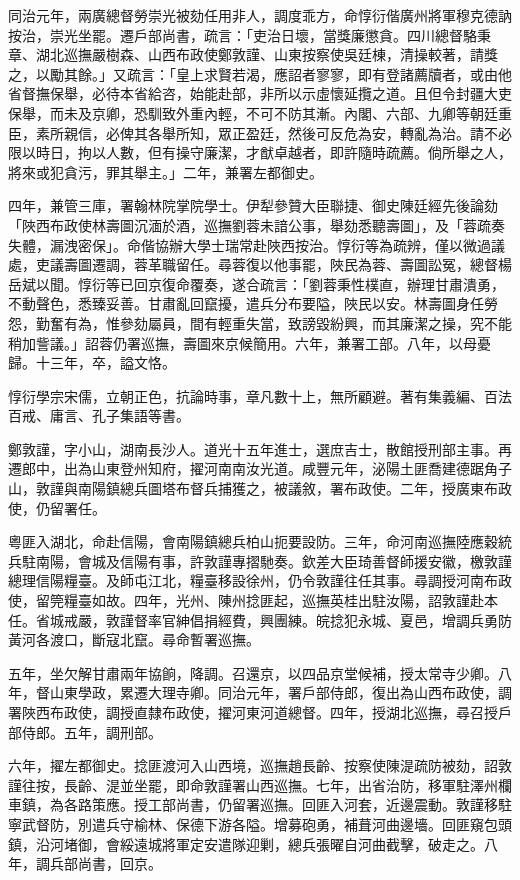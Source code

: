 \begin{pinyinscope}
同治元年，兩廣總督勞崇光被劾任用非人，調度乖方，命惇衍偕廣州將軍穆克德訥按治，崇光坐罷。遷戶部尚書，疏言：「吏治日壞，當獎廉懲貪。四川總督駱秉章、湖北巡撫嚴樹森、山西布政使鄭敦謹、山東按察使吳廷棟，清操較著，請獎之，以勵其餘。」又疏言：「皇上求賢若渴，應詔者寥寥，即有登諸薦牘者，或由他省督撫保舉，必待本省給咨，始能赴部，非所以示虛懷延攬之道。且但令封疆大吏保舉，而未及京卿，恐馴致外重內輕，不可不防其漸。內閣、六部、九卿等朝廷重臣，素所親信，必俾其各舉所知，眾正盈廷，然後可反危為安，轉亂為治。請不必限以時日，拘以人數，但有操守廉潔，才猷卓越者，即許隨時疏薦。倘所舉之人，將來或犯貪污，罪其舉主。」二年，兼署左都御史。

四年，兼管三庫，署翰林院掌院學士。伊犁參贊大臣聯捷、御史陳廷經先後論劾「陜西布政使林壽圖沉湎於酒，巡撫劉蓉未諳公事，舉劾悉聽壽圖」，及「蓉疏奏失體，漏洩密保」。命偕協辦大學士瑞常赴陜西按治。惇衍等為疏辨，僅以微過議處，吏議壽圖遷調，蓉革職留任。尋蓉復以他事罷，陜民為蓉、壽圖訟冤，總督楊岳斌以聞。惇衍等已回京復命覆奏，遂合疏言：「劉蓉秉性樸直，辦理甘肅潰勇，不動聲色，悉臻妥善。甘肅亂回竄擾，遣兵分布要隘，陜民以安。林壽圖身任勞怨，勤奮有為，惟參劾屬員，間有輕重失當，致謗毀紛興，而其廉潔之操，究不能稍加訾議。」詔蓉仍署巡撫，壽圖來京候簡用。六年，兼署工部。八年，以母憂歸。十三年，卒，謚文恪。

惇衍學宗宋儒，立朝正色，抗論時事，章凡數十上，無所顧避。著有集義編、百法百戒、庸言、孔子集語等書。

鄭敦謹，字小山，湖南長沙人。道光十五年進士，選庶吉士，散館授刑部主事。再遷郎中，出為山東登州知府，擢河南南汝光道。咸豐元年，泌陽土匪喬建德踞角子山，敦謹與南陽鎮總兵圖塔布督兵捕獲之，被議敘，署布政使。二年，授廣東布政使，仍留署任。

粵匪入湖北，命赴信陽，會南陽鎮總兵柏山扼要設防。三年，命河南巡撫陸應穀統兵駐南陽，會城及信陽有事，許敦謹專摺馳奏。欽差大臣琦善督師援安徽，檄敦謹總理信陽糧臺。及師屯江北，糧臺移設徐州，仍令敦謹往任其事。尋調授河南布政使，留筦糧臺如故。四年，光州、陳州捻匪起，巡撫英桂出駐汝陽，詔敦謹赴本任。省城戒嚴，敦謹督率官紳倡捐經費，興團練。皖捻犯永城、夏邑，增調兵勇防黃河各渡口，斷寇北竄。尋命暫署巡撫。

五年，坐欠解甘肅兩年協餉，降調。召還京，以四品京堂候補，授太常寺少卿。八年，督山東學政，累遷大理寺卿。同治元年，署戶部侍郎，復出為山西布政使，調署陜西布政使，調授直隸布政使，擢河東河道總督。四年，授湖北巡撫，尋召授戶部侍郎。五年，調刑部。

六年，擢左都御史。捻匪渡河入山西境，巡撫趙長齡、按察使陳湜疏防被劾，詔敦謹往按，長齡、湜並坐罷，即命敦謹署山西巡撫。七年，出省治防，移軍駐澤州欄車鎮，為各路策應。授工部尚書，仍留署巡撫。回匪入河套，近邊震動。敦謹移駐寧武督防，別遣兵守榆林、保德下游各隘。增募砲勇，補葺河曲邊墻。回匪窺包頭鎮，沿河堵御，會綏遠城將軍定安遣隊迎剿，總兵張曜自河曲截擊，破走之。八年，調兵部尚書，回京。


\end{pinyinscope}
